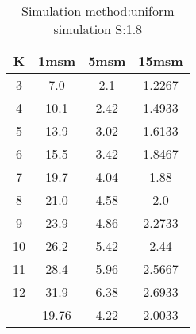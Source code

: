 \begin{table}[H]
\centering
\begin{tabular}{c|ccc}
K &1msm &5msm &15msm\\
\hline
3 & 7.0 & 2.1 & 1.2267\\
4 & 10.1 & 2.42 & 1.4933\\
5 & 13.9 & 3.02 & 1.6133\\
6 & 15.5 & 3.42 & 1.8467\\
7 & 19.7 & 4.04 & 1.88\\
8 & 21.0 & 4.58 & 2.0\\
9 & 23.9 & 4.86 & 2.2733\\
10 & 26.2 & 5.42 & 2.44\\
11 & 28.4 & 5.96 & 2.5667\\
12 & 31.9 & 6.38 & 2.6933\\
\hline
& 19.76 & 4.22 & 2.0033\\
\end{tabular}
\caption{Simulation method:uniform simulation S:1.8}
\label{tab:s1.8}
\end{table}
